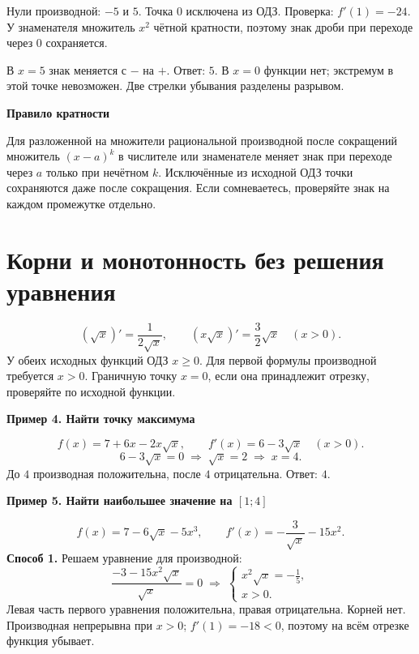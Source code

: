 \documentclass[a4paper,12pt]{article}
\newcommand{\topic}[1]{\section{\textcolor{darkaccent}{#1}}}
\newcommand{\ex}[1]{\par\medskip\textbf{#1}\par\smallskip}
\newcommand{\key}[1]{\par\smallskip\textcolor{darkaccent}{\textbf{#1}}\par\smallskip}
\begin{document}
Нули производной: $-5$ и $5$. Точка $0$ исключена из ОДЗ. Проверка: $f'(1)=-24$. У знаменателя множитель $x^2$ чётной кратности, поэтому знак дроби при переходе через $0$ сохраняется.
\begin{center}
\end{center}
В $x=5$ знак меняется с $-$ на $+$. Ответ: $5$. В $x=0$ функции нет; экстремум в этой точке невозможен. Две стрелки убывания разделены разрывом.
\key{Правило кратности}
Для разложенной на множители рациональной производной после сокращений множитель $(x-a)^k$ в числителе или знаменателе меняет знак при переходе через $a$ только при нечётном $k$. Исключённые из исходной ОДЗ точки сохраняются даже после сокращения. Если сомневаетесь, проверяйте знак на каждом промежутке отдельно.
\clearpage
\topic{Корни и монотонность без решения уравнения}
\[ (\sqrt{x})'=\frac1{2\sqrt{x}},\qquad (x\sqrt{x})'=\frac32\sqrt{x}\quad(x>0).\]
У обеих исходных функций ОДЗ $x\ge0$. Для первой формулы производной требуется $x>0$. Граничную точку $x=0$, если она принадлежит отрезку, проверяйте по исходной функции.
\ex{Пример 4. Найти точку максимума}
\[f(x)=7+6x-2x\sqrt{x},\qquad f'(x)=6-3\sqrt{x}\quad(x>0).\]
\[6-3\sqrt{x}=0\;\Longrightarrow\;\sqrt{x}=2\;\Longrightarrow\; x=4.\]
До $4$ производная положительна, после $4$ отрицательна. Ответ: $4$.
\ex{Пример 5. Найти наибольшее значение на $[1;4]$}
\[f(x)=7-6\sqrt{x}-5x^3,\qquad f'(x)=-\frac3{\sqrt{x}}-15x^2.\]
\textbf{Способ 1.} Решаем уравнение для производной:
\[\frac{-3-15x^2\sqrt{x}}{\sqrt{x}}=0\;\Longrightarrow\;
\begin{cases}x^2\sqrt{x}=-\frac15,\\x>0.\end{cases}\]
Левая часть первого уравнения положительна, правая отрицательна. Корней нет. Производная непрерывна при $x>0$; $f'(1)=-18<0$, поэтому на всём отрезке функция убывает.
\end{document}
